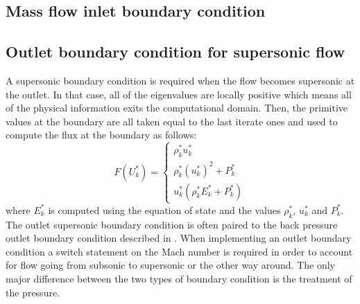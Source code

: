 \subsection{Mass flow inlet boundary condition} \label{sec:inlet_mass_flow}
\subsection{Outlet boundary condition for supersonic flow} \label{sec:outlet_supersonic_bc}
A supersonic boundary condition is required when the flow becomes supersonic at the outlet. In that case, all of the eigenvalues are locally positive which means all of the physical information exits the computational domain. Then, the primitive values at the boundary are all taken equal to the last iterate ones and used to compute the flux at the boundary as follows:
\begin{equation}
F(U^*_k) = \left\{
\begin{array}{ccc}
\rho^*_k u^*_k \\
\rho^*_k (u^*_k)^2 + P^*_k \\
u^*_k \left( \rho^*_k E^*_k + P^*_k\right)
\end{array}
\right.
\end{equation}
where $E^*_k$ is computed using the equation of state and the values $\rho^*_k$, $u^*_k$ and $P^*_k$.\\
The outlet supersonic boundary condition is often paired to the back pressure outlet boundary condition described in . When implementing an outlet boundary condition a switch statement on the Mach number is required in order to account for flow going from subsonic to supersonic or the other way around. The only major difference between the two types of boundary condition is the treatment of the pressure. 

